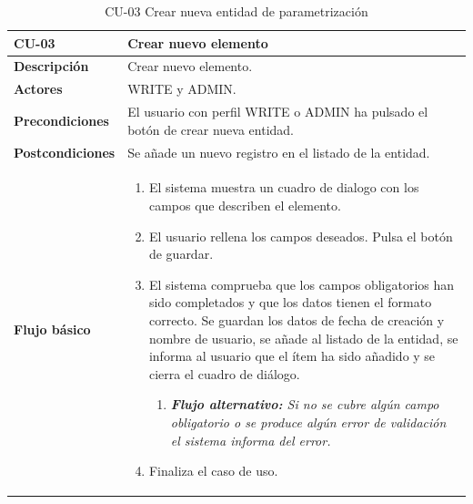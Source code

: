 \begin{table} [H]
    \centering
    \setlength{\leftmargini}{0.4cm}
	\resizebox{15cm}{!} { %
    \begin{tabular}{| m{3cm} | m{12cm} |}   
    \hline
	  \textbf{CU-03} & \textbf{Crear nuevo elemento} \\\hline
	  \textbf{Descripción} & Crear nuevo elemento. \\\hline
	  \textbf{Actores} & WRITE y ADMIN. \\\hline
	  \textbf{Precondiciones} & El usuario con perfil WRITE o ADMIN ha pulsado el botón de crear nueva entidad. \\\hline
	  \textbf{Postcondiciones} & Se añade un nuevo registro en el listado de la entidad. \\\hline
	  \textbf{Flujo básico} & 
		\begin{enumerate}
	  	\item El sistema muestra un cuadro de dialogo con los campos que describen el elemento.
\item El usuario rellena los campos deseados. Pulsa el botón de guardar.
\item El sistema comprueba que los campos obligatorios han sido completados y que los datos tienen el formato correcto. Se guardan los datos de fecha de creación y nombre de usuario, se añade al listado de la entidad, se informa al usuario que el ítem ha sido añadido y se cierra el cuadro de diálogo.
			\begin{enumerate}	
			   \item \textit{\textbf{Flujo alternativo:} Si no se cubre algún campo obligatorio o se produce algún error de validación el sistema informa del error.}			   
			\end{enumerate}
\item Finaliza el caso de uso.
	  \end{enumerate} 	  	  
	  \\\hline
    \end{tabular}
    } %
    \caption{CU-03 Crear nueva entidad de parametrización}
    \label{tab:cu-nuevo-elemento}
\end{table}


